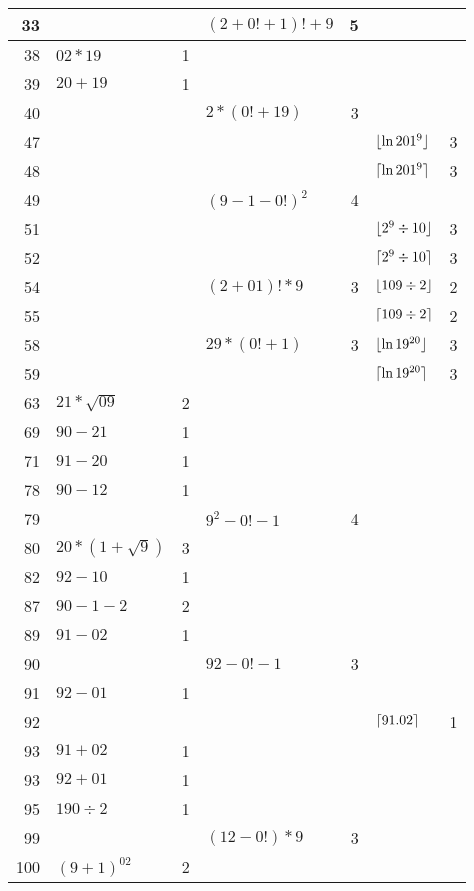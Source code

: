 \begin{longtable}{r l r l r l r}
33 & & & $(2+0!+1)!+9$ & 5 \\ \midrule
38 & $02*19$ & 1 \\ \midrule
39 & $20+19$ & 1 \\ \midrule
\midrule
40 & & & $2*(0!+19)$ & 3 \\ \midrule
47 & & & & & $\lfloor\ln 201^9\rfloor$ & 3 \\ \midrule
48 & & & & & $\lceil\ln 201^9\rceil$ & 3 \\ \midrule
49 & & & ${(9-1-0!)}^2$ & 4 \\ \midrule
\midrule
51 & & & & & $\lfloor2^9\div10\rfloor$ & 3 \\ \midrule
52 & & & & & $\lceil2^9\div10\rceil$ & 3 \\ \midrule
54 & & & $(2+01)!*9$ & 3 & $\lfloor109\div2\rfloor$ & 2 \\ \midrule
55 & & & & & $\lceil109\div2\rceil$ & 2 \\ \midrule
58 & & & $29*(0!+1)$ & 3 & $\lfloor\ln 19^{20}\rfloor$ & 3 \\ \midrule
59 & & & & & $\lceil\ln 19^{20}\rceil$ & 3 \\ \midrule
\midrule
63 & $21*\sqrt{09}$ & 2 \\ \midrule
69 & $90-21$ & 1 \\ \midrule\midrule
71 & $91-20$ & 1 \\ \midrule
78 & $90-12$ & 1 \\ \midrule
79 & & & $9^2-0!-1$ & 4 \\ \midrule
\midrule
80 & $20*(1+\sqrt{9})$ & 3 \\ \midrule
82 & $92-10$ & 1 \\ \midrule
87 & $90-1-2$ & 2 \\ \midrule
89 & $91-02$ & 1 \\ \midrule
\midrule
90 & & & $92-0!-1$ & 3 \\ \midrule
91 & $92-01$ & 1 \\ \midrule
92 & & & & & $\lceil91.02\rceil$ & 1 \\ \midrule
93 & $91+02$ & 1 \\ \midrule
93 & $92+01$ & 1 \\ \midrule
95 & $190\div2$ & 1 \\ \midrule
99 & & & $(12-0!)*9$ & 3 \\ \midrule
\midrule
100 & ${(9+1)}^{02}$ & 2 \\ \bottomrule
\end{longtable}